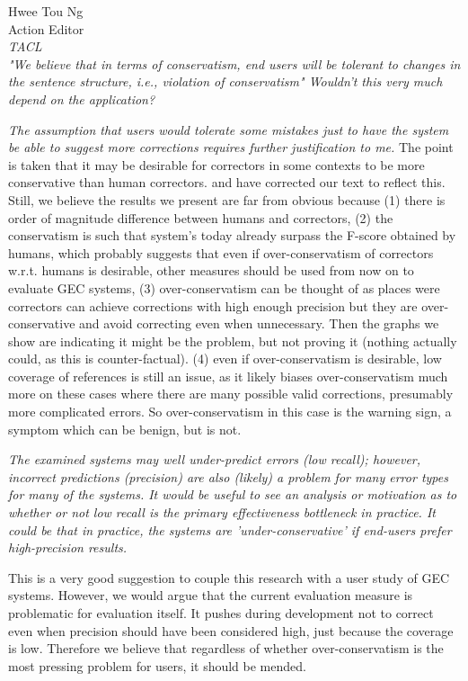 \documentclass[11pt,letterpaper]{letter}
\begin{document}
\begin{letter}{%
Hwee Tou Ng\\
Action Editor\\
{\em TACL}\\
}
\emph{"We believe that in terms of conservatism, end users will be tolerant to
	changes in the sentence structure, i.e., violation of conservatism" Wouldn't
	this very much depend on the application?
	}

\emph{The assumption that users would tolerate
	some mistakes just to have the system be able to suggest more corrections
	requires further justification to me.
	}
The point is taken that it may be desirable for correctors in some contexts to be more conservative than human correctors. and have corrected our text to reflect this. Still, we believe the results we present are far from obvious because (1) there is order of magnitude difference between humans and correctors, (2) the conservatism is such that system's today already surpass the F-score obtained by humans, which probably suggests that even if over-conservatism of correctors w.r.t. humans is desirable, other measures should be used from now on to evaluate GEC systems, (3) over-conservatism can be thought of as places were correctors can achieve corrections with high enough precision but they are over-conservative and avoid correcting even when unnecessary. Then the graphs we show are indicating it might be the problem, but not proving it (nothing actually could, as this is counter-factual). (4) even if over-conservatism is desirable, low coverage of references is still an issue, as it likely biases over-conservatism much more on these cases where there are many possible valid corrections, presumably more complicated errors. So over-conservatism in this case is the warning sign, a symptom which can be benign, but is not.

\emph{The examined systems may well under-predict errors (low recall); however,
	incorrect predictions (precision) are also (likely) a problem for many error
	types for many of the systems. It would be useful to see an analysis or
	motivation as to whether or not low recall is the primary effectiveness
	bottleneck in practice. It could be that in practice, the systems are
	'under-conservative' if end-users prefer high-precision results.
	}

This is a very good suggestion to couple this research with a user study of GEC systems. However, we would argue that the current evaluation measure is problematic for evaluation itself. It pushes during development not to correct even when precision should have been considered high, just because the coverage is low. Therefore we believe that regardless of whether over-conservatism is the most pressing problem for users, it should be mended. 


\end{letter}
\end{document}
